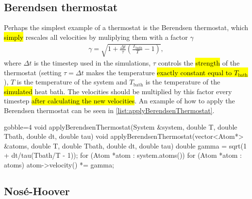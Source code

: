 \subsection{Berendsen thermostat}
Perhaps the simplest example of a thermostat is the Berendsen thermostat\cite{berendsen1984molecular}, which \hl{simply} rescales all velocities by muliplying them with a factor $\gamma$
\begin{align*}
    \gamma = \sqrt{1 + \frac{\Delta t}{\tau}\left(\frac{T_\text{bath}}{T} - 1\right)},
\end{align*}
where $\Delta t$ is the timestep used in the simulations, $\tau$ controls the \hl{strength} of the thermostat (setting $\tau = \Delta t$ makes the temperature \hl{exactly constant equal to $T_\text{bath}$}), $T$ is the temperature of the system and $T_\text{bath}$ is the temperature of the \hl{simulated} heat bath. The velocities should be multiplied by this factor every timestep \hl{after calculating the new velocities}. An example of how to apply the Berendsen thermostat can be seen in \cref{list:applyBerendsenThermostat}.
%
\begin{listing}[!htb]%
\begin{cppcode*}{gobble=4}
    void applyBerendsenThermostat(System &system, double T, double Tbath, 
        double dt, double tau)
    void applyBerendsenThermostat(vector<Atom*> &atoms, double T, double Tbath, 
        double dt, double tau)
    {
        double gamma = sqrt(1 + dt/tau(Tbath/T - 1));
        for (Atom *atom : system.atoms())
        for (Atom *atom : atoms)
        {
            atom->velocity() *= gamma;
        }
    }
\end{cppcode*}%
\caption{%
    \texttt{applyBerendsenThermostat}. \hl{decide on System or vector<Atom*> as input}%
    \label{list:applyBerendsenThermostat}%
}%
\end{listing}%

\subsection{Nos\'e-Hoover}




